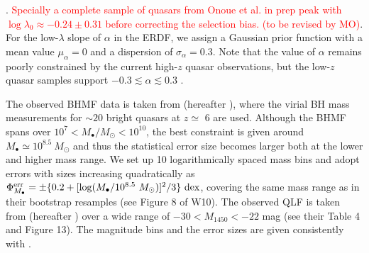\documentclass[twocolumn, twocolappendix]{aastex63}
\newcommand{\Msun}{M_\odot}
\newcommand{\Mbh}{M_\bullet}
\newcommand{\Muv}{M_{1450}}
\newcommand{\red}[1]{\textcolor{red}{ #1}}
\newcommand{\blue}[1]{\textcolor{blue}{ #1}}
\begin{document}
\begin{CJK*}{UTF8}{gbsn}
\citep[e.g.,][]{2010AJ....140..546W}.
\red{Specially a complete sample of quasars from Onoue et al. in prep peak with $\log \lambda_0 \approx -0.24 \pm 0.31$ 
before correcting the selection bias. (to be revised by MO)}.
For the low-$\lambda$ slope of $\alpha$ in the ERDF, we assign a Gaussian prior function with a mean value 
$\mu_{\alpha}=0$ and a dispersion of $\sigma_{\alpha}=0.3$.
Note that the value of $\alpha$ remains poorly constrained by the current high-$z$ quasar observations,
but the low-$z$ quasar samples support $-0.3 \lesssim \alpha \lesssim 0.3$ \citep[e.g., see Figure 21 in][]{2015MNRAS.447.2085S}.


%
The observed BHMF data is taken from \citet{2010AJ....140..546W} (hereafter ), where 
the virial BH mass measurements for $\sim 20$ bright quasars at $z\simeq $ 6 are used.
Although the BHMF spans over $10^7 < \Mbh/\Msun <10^{10}$, the best constraint is given around 
$\Mbh \simeq 10^{8.5}~\Msun$
and thus the statistical error size becomes larger both at the lower and higher mass range.
We set up 10 logarithmically spaced mass bins and adopt errors with sizes increasing quadratically as 
$\Phi_{\Mbh}^{\rm err} = \pm \{0.2 +   [\log (\Mbh/10^{8.5}~\Msun)]^2/3 \}~{\rm dex}$,
covering the same mass range as in their bootstrap resamples (see Figure 8 of W10). 
The observed QLF is taken from \citet{2018ApJ...869..150M} (hereafter ) 
over a wide range of $-30 < \Muv <-22$ mag (see their Table 4 and Figure 13). 
The magnitude bins and the error sizes are given consistently with .


\end{CJK*}
\end{document}
